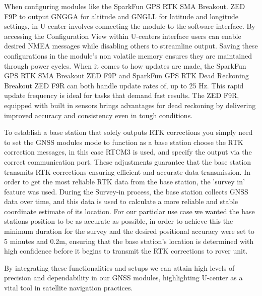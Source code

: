 \documentclass{report}
\begin{document}
When configuring modules like the SparkFun GPS RTK SMA Breakout. ZED F9P to
output GNGGA for altitude and GNGLL for latitude and longitude settings, in
U-center involves connecting the module to the software interface. By accessing
the Configuration View within U-centers interface users can enable desired NMEA
messages while disabling others to streamline output. Saving these
configurations in the module's non volatile memory ensures they are maintained
through power cycles. When it comes to how updates are made, the SparkFun GPS
RTK SMA Breakout ZED F9P and SparkFun GPS RTK Dead Reckoning Breakout ZED F9R
can both handle update rates of, up to 25 Hz. This rapid update frequency is
ideal for tasks that demand fast results. The ZED F9R, equipped with built in
sensors brings advantages for dead reckoning by delivering improved accuracy and
consistency even in tough conditions.

To establish a base station that solely outputs RTK corrections you simply need
to set the GNSS modules mode to function as a base station choose the RTK
correction messages, in this case RTCM3 is used, and specify the output via the
correct communication port. These adjustments guarantee that the base station
transmits RTK corrections ensuring efficient and accurate data transmission. In
order to get the most reliable RTK data from the base station, the 'survey in'
feature was used. During the Survey-in process, the base station collects GNSS
data over time, and this data is used to calculate a more reliable and stable
coordinate estimate of its location. For our particlar use case we wanted the
base stations position to be as accurate as possible, in order to achieve this
the minimum duration for the survey and the desired positional accuracy were set
to 5 minutes and 0.2m, ensuring that the base station's location is determined
with high confidence before it begins to transmit the  RTK corrections to rover
unit.

By integrating these functionalities and setups we can attain high levels of
precision and dependability in our GNSS modules, highlighting U-center as a
vital tool in satellite navigation practices.
\end{document}
